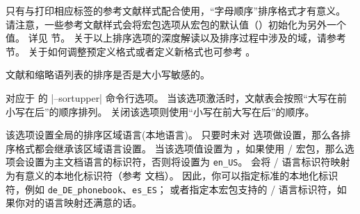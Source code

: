 \begin{optionlist}
只有与打印相应标签的参考文献样式配合使用，“字母顺序”排序格式才有意义。
请注意，一些参考文献样式会将宏包选项从宏包的默认值（）初始化为另外一个值。
详见  节。
关于以上排序选项的深度解读以及排序过程中涉及的域，请参考  节。
关于如何调整预定义格式或者定义新格式也可参考 。



文献和缩略语列表的排序是否是大小写敏感的。



对应于 \biber 的 |--sortupper| 命令行选项。
当该选项激活时，文献表会按照“大写在前小写在后”的顺序排列。
关闭该选项则使用“小写在前大写在后”的顺序。


该选项设置全局的排序区域语言(本地语言)。
只要时未对  选项做设置，那么各排序格式都会继承该区域语言设置。
当该选项值设置为 ，如果使用 / 宏包，那么选项会设置为主文档语言的标识符，否则将设置为 \texttt{en\_US}。
\biber 会将 / 语言标识符映射为有意义的本地化标识符（参考 \biber 文档）。
因此，你可以指定标准的本地化标识符，例如 \texttt{de\_DE\_phonebook}、\texttt{es\_ES}；
或者指定本宏包支持的 / 语言标识符，如果你对\biber 的语言映射还满意的话。


\end{optionlist}
